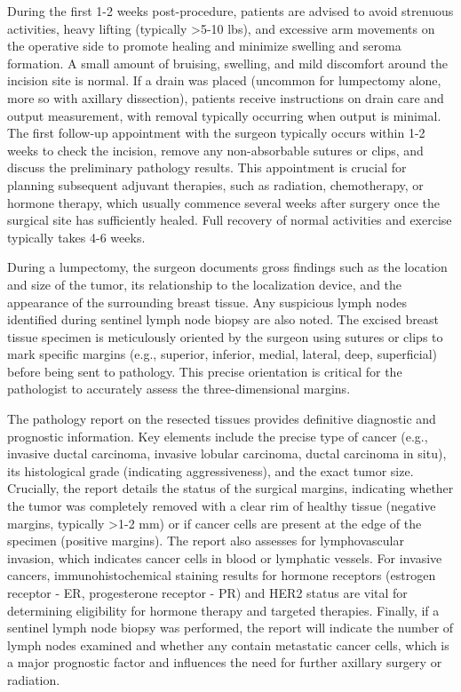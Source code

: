 During the first 1-2 weeks post-procedure, patients are advised to avoid strenuous activities, heavy lifting (typically >5-10 lbs), and excessive arm movements on the operative side to promote healing and minimize swelling and seroma formation. A small amount of bruising, swelling, and mild discomfort around the incision site is normal. If a drain was placed (uncommon for lumpectomy alone, more so with axillary dissection), patients receive instructions on drain care and output measurement, with removal typically occurring when output is minimal. The first follow-up appointment with the surgeon typically occurs within 1-2 weeks to check the incision, remove any non-absorbable sutures or clips, and discuss the preliminary pathology results. This appointment is crucial for planning subsequent adjuvant therapies, such as radiation, chemotherapy, or hormone therapy, which usually commence several weeks after surgery once the surgical site has sufficiently healed. Full recovery of normal activities and exercise typically takes 4-6 weeks.

During a lumpectomy, the surgeon documents gross findings such as the location and size of the tumor, its relationship to the localization device, and the appearance of the surrounding breast tissue. Any suspicious lymph nodes identified during sentinel lymph node biopsy are also noted. The excised breast tissue specimen is meticulously oriented by the surgeon using sutures or clips to mark specific margins (e.g., superior, inferior, medial, lateral, deep, superficial) before being sent to pathology. This precise orientation is critical for the pathologist to accurately assess the three-dimensional margins.

The pathology report on the resected tissues provides definitive diagnostic and prognostic information. Key elements include the precise type of cancer (e.g., invasive ductal carcinoma, invasive lobular carcinoma, ductal carcinoma in situ), its histological grade (indicating aggressiveness), and the exact tumor size. Crucially, the report details the status of the surgical margins, indicating whether the tumor was completely removed with a clear rim of healthy tissue (negative margins, typically >1-2 mm) or if cancer cells are present at the edge of the specimen (positive margins). The report also assesses for lymphovascular invasion, which indicates cancer cells in blood or lymphatic vessels. For invasive cancers, immunohistochemical staining results for hormone receptors (estrogen receptor - ER, progesterone receptor - PR) and HER2 status are vital for determining eligibility for hormone therapy and targeted therapies. Finally, if a sentinel lymph node biopsy was performed, the report will indicate the number of lymph nodes examined and whether any contain metastatic cancer cells, which is a major prognostic factor and influences the need for further axillary surgery or radiation.

